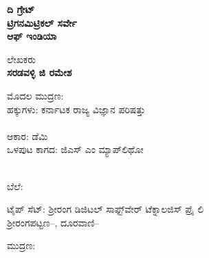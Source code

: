 \thispagestyle{empty}

\begin{center}
\textbf{ದಿ ಗ್ರೇಟ್​}\\\textbf{ಟ್ರಿಗನಮಿಟ್ರಿಕಲ್​ ಸರ್ವೇ}\\\textbf{ಆಫ್​ ಇಂಡಿಯಾ}
\end{center}

\vfill

\begin{center}
ಲೇಖಕರು\\\textbf{ಸರಡವಳ್ಳಿ ಜಿ ರಮೇಶ}
\end{center}

\vfill







\vfill

\begin{center}
ಮೊದಲ ಮುದ್ರಣ: \\ಹಕ್ಕುಗಳು: ಕರ್ನಾಟಕ ರಾಜ್ಯ ವಿಜ್ಞಾನ ಪರಿಷತ್ತು\\\\ಆಕಾರ:  ಡೆಮಿ\\ಒಳಪುಟ ಕಾಗದ:  ಜಿಎಸ್​ ಎಂ ಮ್ಯಾಪ್​ಲಿಥೋ
\end{center}

\begin{center}
\\ಬೆಲೆ:
\end{center}

\begin{center}
ಟೈಪ್​ ಸೆಟ್​: ಶ‍್ರೀರಂಗ ಡಿಜಿಟಲ್​ ಸಾಫ್ಟ್​ವೇರ್ ​ಟೆಕ್ನಾಲಜಿಸ್​ ಪ್ರೈ ಲಿ\\ಶ‍್ರೀರಂಗಪಟ್ಟಣ–, ದೂರವಾಣಿ–
\end{center}

\begin{center}
ಮುದ್ರಣ:
\end{center}

